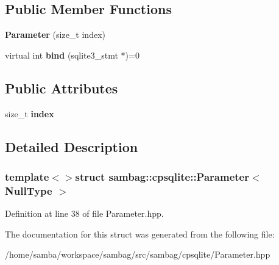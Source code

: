 \subsection*{Public Member Functions}
\begin{DoxyCompactItemize}
\item 
\hypertarget{structsambag_1_1cpsqlite_1_1_parameter_3_01_null_type_01_4_a1ea0b6f9d2697d99e6f2d6531f4bd075}{
{\bfseries Parameter} (size\_\-t index)}
\label{structsambag_1_1cpsqlite_1_1_parameter_3_01_null_type_01_4_a1ea0b6f9d2697d99e6f2d6531f4bd075}

\item 
\hypertarget{structsambag_1_1cpsqlite_1_1_parameter_3_01_null_type_01_4_a6d5826db5309ac05e7f267a4cf9835aa}{
virtual int {\bfseries bind} (sqlite3\_\-stmt $\ast$)=0}
\label{structsambag_1_1cpsqlite_1_1_parameter_3_01_null_type_01_4_a6d5826db5309ac05e7f267a4cf9835aa}

\end{DoxyCompactItemize}
\subsection*{Public Attributes}
\begin{DoxyCompactItemize}
\item 
\hypertarget{structsambag_1_1cpsqlite_1_1_parameter_3_01_null_type_01_4_a0f20eb15a9fa2a94b8ea1274ad76e99f}{
size\_\-t {\bfseries index}}
\label{structsambag_1_1cpsqlite_1_1_parameter_3_01_null_type_01_4_a0f20eb15a9fa2a94b8ea1274ad76e99f}

\end{DoxyCompactItemize}


\subsection{Detailed Description}
\subsubsection*{template$<$$>$struct sambag::cpsqlite::Parameter$<$ NullType $>$}



Definition at line 38 of file Parameter.hpp.



The documentation for this struct was generated from the following file:\begin{DoxyCompactItemize}
\item 
/home/samba/workspace/sambag/src/sambag/cpsqlite/Parameter.hpp\end{DoxyCompactItemize}
